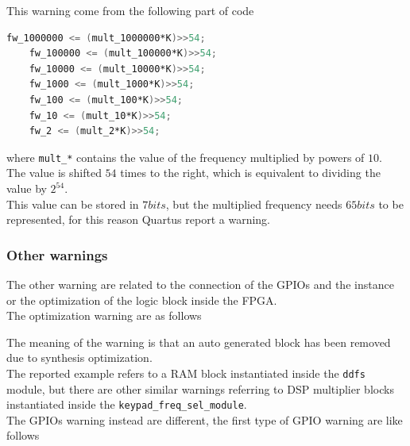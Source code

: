 \newpage
\noindent
This warning come from the following part of code

\begin{lstlisting}[language=Verilog]
    fw_1000000 <= (mult_1000000*K)>>54;
    fw_100000 <= (mult_100000*K)>>54;
    fw_10000 <= (mult_10000*K)>>54;
    fw_1000 <= (mult_1000*K)>>54;
    fw_100 <= (mult_100*K)>>54;
    fw_10 <= (mult_10*K)>>54;
    fw_2 <= (mult_2*K)>>54;
\end{lstlisting}

\noindent
where \texttt{mult\_*} contains the value of the frequency multiplied by powers of \(10\). \\
The value is shifted \(54\) times to the right, which is equivalent to dividing the value by \(2^{54}\).\\
This value can be stored in \(7 bits\), but the multiplied frequency needs \(65 bits\) to be represented, for this reason Quartus report a warning.


\subsubsection{Other warnings}
The other warning are related to the connection of the GPIOs and the instance or the optimization of the logic block inside the FPGA. \\
The optimization warning are as follows

\begin{warningbox}[Warning]
     \newline
     \newline
\end{warningbox}

\noindent
The meaning of the warning is that an auto generated block has been removed due to synthesis optimization. \\
The reported example refers to a RAM block instantiated inside the \texttt{ddfs} module, but there are other similar warnings referring to DSP multiplier blocks instantiated inside the \texttt{keypad\_freq\_sel\_module}. \\
The GPIOs warning instead are different, the first type of GPIO warning are like follows

